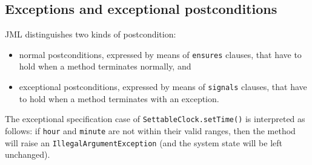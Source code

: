 \documentclass{llncs}
\begin{document}
\subsection{Exceptions and exceptional postconditions}
\label{Sec:Exceptions}

JML distinguishes two kinds of postcondition: 
\begin{itemize}
  \item normal postconditions, expressed
    by means of \texttt{ensures} clauses, that have to hold when a method
    terminates normally, and
    \item exceptional postconditions, expressed by means of \texttt{signals}
      clauses, that have to hold when a method terminates with an exception.
\end{itemize}
%
The exceptional specification case of \texttt{SettableClock.setTime()} is
interpreted as follows: if \texttt{hour} and \texttt{minute} are not within
their valid ranges, then the method will raise an \texttt{IllegalArgumentException} 
(and the system state will be left unchanged).

%
%
%
\end{document}
